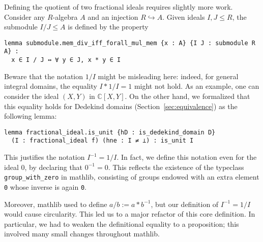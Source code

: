 \documentclass[a4paper,USenglish,cleveref, autoref, thm-restate]{lipics-v2021}
\newcommand{\C}{\mathbb{C}}
\newcommand{\lean}[1]{\texttt{#1}\xspace} %
\newcommand{\mathlib}{\textsf{mathlib}\xspace}
\begin{document}
Defining the quotient of two fractional ideals requires slightly more work. Consider any $R$-algebra $A$ and an injection $R\hookrightarrow A$. Given ideals $I,J\le R$, the submodule $I / J\le A$ %
is defined by the property
\begin{lstlisting}
lemma submodule.mem_div_iff_forall_mul_mem {x : A} {I J : submodule R A} :
  x ∈ I / J ↔ ∀ y ∈ J, x * y ∈ I
\end{lstlisting}
Beware that the notation $1/I$ might be misleading here: indeed, for general integral domains, the equality $I\ast 1/I=1$ might not hold. As an example, one can consider the ideal $(X,Y)$ in $\C[X,Y]$.
On the other hand, we formalized that this equality holds for Dedekind domains (Section~\ref{sec:equivalence}) as the following lemma:
\begin{lstlisting}
lemma fractional_ideal.is_unit {hD : is_dedekind_domain D}
  (I : fractional_ideal f) (hne : I ≠ ⊥) : is_unit I
\end{lstlisting}
This justifies the notation $I^{-1}=1/I$. In fact, we define this notation even for the ideal $0$, by declaring that $0^{-1}=0$. This reflects the existence of the typeclass \lean{group\_with\_zero} in \mathlib, consisting of groups endowed with an extra element \lean{0} whose inverse is again \lean{0}. %

Moreover, \mathlib used to define \lean{$a / b := a * b^{-1}$}, but our definition of $I^{-1} = 1 / I$ would cause circularity. This led us to a major refactor of this core definition. In particular, we had to weaken the definitional equality to a proposition; this involved many small changes throughout \mathlib.
\end{document}
